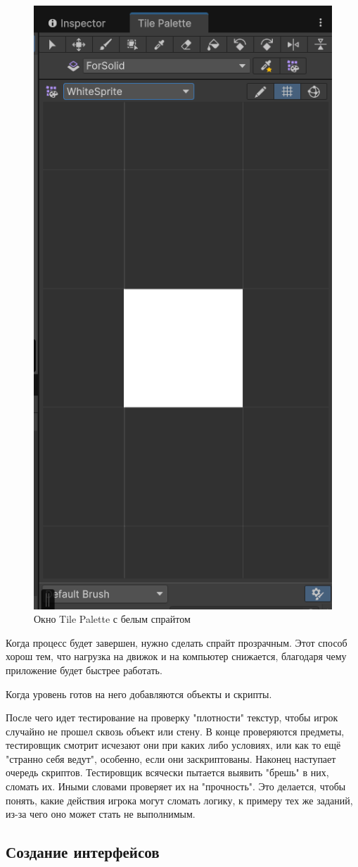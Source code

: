 \documentclass[bachelor, och, coursework, times]{SCWorks}
\begin{document}
    \begin{figure} [H]
        \centering
    \includegraphics[width=0.50\linewidth]{Pictures/Снимок экрана 2025-06-25 203441.png}
    \caption{Окно Tile Palette с белым спрайтом}
    \label{fig:Textures}
    \end{figure}

    Когда процесс будет завершен, нужно сделать спрайт прозрачным. Этот способ хорош тем, что
    нагрузка на движок и на компьютер снижается, благодаря чему приложение будет быстрее работать.

    Когда уровень готов на него добавляются объекты и скрипты.

    После чего идет тестирование на проверку "плотности" текстур, чтобы игрок случайно не 
    прошел сквозь объект или стену. В конце проверяются предметы, тестировщик смотрит
    исчезают они при каких либо условиях, или как то ещё "странно себя ведут", особенно, если
    они заскриптованы.
    Наконец наступает очередь скриптов. Тестировщик всячески пытается выявить "брешь" в них,
    сломать их. Иными словами проверяет их на "прочность". Это делается, чтобы понять,
    какие действия игрока могут сломать логику, к примеру тех же заданий, из-за чего оно 
    может стать не выполнимым.
   
    \subsection{Создание интерфейсов}
\end{document}
